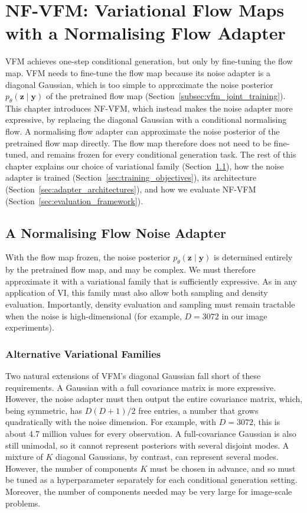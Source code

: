 \documentclass[12pt,a4paper]{report}
\begin{document}
\chapter{NF-VFM: Variational Flow Maps with a Normalising Flow Adapter}
\label{chap:method}
VFM achieves one-step conditional generation, but only by fine-tuning the flow map. VFM needs to fine-tune the flow map because its noise adapter is a diagonal Gaussian, which is too simple to approximate the noise posterior $p_{\theta}(\mathbf{z}\mid\mathbf{y})$ of the pretrained flow map (Section~\ref{subsec:vfm_joint_training}). This chapter introduces NF-VFM, which instead makes the noise adapter more expressive, by replacing the diagonal Gaussian with a conditional normalising flow. A normalising flow adapter can approximate the noise posterior of the pretrained flow map directly. The flow map therefore does not need to be fine-tuned, and remains frozen for every conditional generation task. The rest of this chapter explains our choice of variational family (Section~\ref{sec:nf_noise_adapter}), how the noise adapter is trained (Section~\ref{sec:training_objectives}), its architecture (Section~\ref{sec:adapter_architectures}), and how we evaluate NF-VFM (Section~\ref{sec:evaluation_framework}).


\section{A Normalising Flow Noise Adapter}
\label{sec:nf_noise_adapter}
With the flow map frozen, the noise posterior $p_{\theta}(\mathbf{z}\mid\mathbf{y})$ is determined entirely by the pretrained flow map, and may be complex. We must therefore approximate it with a variational family that is sufficiently expressive. As in any application of VI, this family must also allow both sampling and density evaluation. Importantly, density evaluation and sampling must remain tractable when the noise is high-dimensional (for example, $D=3072$ in our image experiments).

\subsection{Alternative Variational Families}
\label{subsec:alternative_variational_families}
Two natural extensions of VFM's diagonal Gaussian fall short of these requirements. A Gaussian with a full covariance matrix is more expressive. However, the noise adapter must then output the entire covariance matrix, which, being symmetric, has $D(D+1)/2$ free entries, a number that grows quadratically with the noise dimension. For example, with $D=3072$, this is about 4.7 million values for every observation. A full-covariance Gaussian is also still unimodal, so it cannot represent posteriors with several disjoint modes. A mixture of $K$ diagonal Gaussians, by contrast, can represent several modes. However, the number of components $K$ must be chosen in advance, and so must be tuned as a hyperparameter separately for each conditional generation setting. Moreover, the number of components needed may be very large for image-scale problems. 
\end{document}
